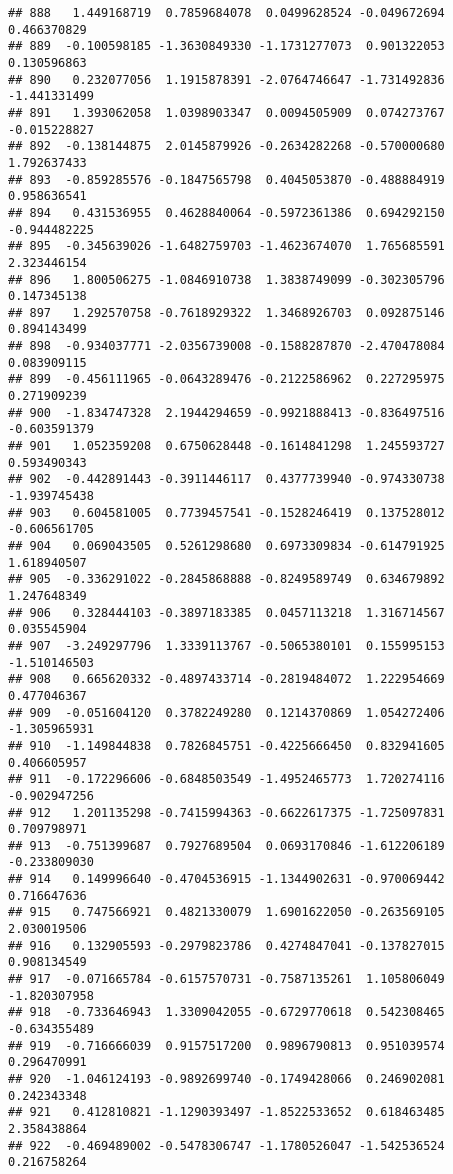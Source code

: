 \documentclass[
]{article}
\begin{document}
\begin{verbatim}
## 888   1.449168719  0.7859684078  0.0499628524 -0.049672694  0.466370829
## 889  -0.100598185 -1.3630849330 -1.1731277073  0.901322053  0.130596863
## 890   0.232077056  1.1915878391 -2.0764746647 -1.731492836 -1.441331499
## 891   1.393062058  1.0398903347  0.0094505909  0.074273767 -0.015228827
## 892  -0.138144875  2.0145879926 -0.2634282268 -0.570000680  1.792637433
## 893  -0.859285576 -0.1847565798  0.4045053870 -0.488884919  0.958636541
## 894   0.431536955  0.4628840064 -0.5972361386  0.694292150 -0.944482225
## 895  -0.345639026 -1.6482759703 -1.4623674070  1.765685591  2.323446154
## 896   1.800506275 -1.0846910738  1.3838749099 -0.302305796  0.147345138
## 897   1.292570758 -0.7618929322  1.3468926703  0.092875146  0.894143499
## 898  -0.934037771 -2.0356739008 -0.1588287870 -2.470478084  0.083909115
## 899  -0.456111965 -0.0643289476 -0.2122586962  0.227295975  0.271909239
## 900  -1.834747328  2.1944294659 -0.9921888413 -0.836497516 -0.603591379
## 901   1.052359208  0.6750628448 -0.1614841298  1.245593727  0.593490343
## 902  -0.442891443 -0.3911446117  0.4377739940 -0.974330738 -1.939745438
## 903   0.604581005  0.7739457541 -0.1528246419  0.137528012 -0.606561705
## 904   0.069043505  0.5261298680  0.6973309834 -0.614791925  1.618940507
## 905  -0.336291022 -0.2845868888 -0.8249589749  0.634679892  1.247648349
## 906   0.328444103 -0.3897183385  0.0457113218  1.316714567  0.035545904
## 907  -3.249297796  1.3339113767 -0.5065380101  0.155995153 -1.510146503
## 908   0.665620332 -0.4897433714 -0.2819484072  1.222954669  0.477046367
## 909  -0.051604120  0.3782249280  0.1214370869  1.054272406 -1.305965931
## 910  -1.149844838  0.7826845751 -0.4225666450  0.832941605  0.406605957
## 911  -0.172296606 -0.6848503549 -1.4952465773  1.720274116 -0.902947256
## 912   1.201135298 -0.7415994363 -0.6622617375 -1.725097831  0.709798971
## 913  -0.751399687  0.7927689504  0.0693170846 -1.612206189 -0.233809030
## 914   0.149996640 -0.4704536915 -1.1344902631 -0.970069442  0.716647636
## 915   0.747566921  0.4821330079  1.6901622050 -0.263569105  2.030019506
## 916   0.132905593 -0.2979823786  0.4274847041 -0.137827015  0.908134549
## 917  -0.071665784 -0.6157570731 -0.7587135261  1.105806049 -1.820307958
## 918  -0.733646943  1.3309042055 -0.6729770618  0.542308465 -0.634355489
## 919  -0.716666039  0.9157517200  0.9896790813  0.951039574  0.296470991
## 920  -1.046124193 -0.9892699740 -0.1749428066  0.246902081  0.242343348
## 921   0.412810821 -1.1290393497 -1.8522533652  0.618463485  2.358438864
## 922  -0.469489002 -0.5478306747 -1.1780526047 -1.542536524  0.216758264

\end{verbatim}
\end{document}
